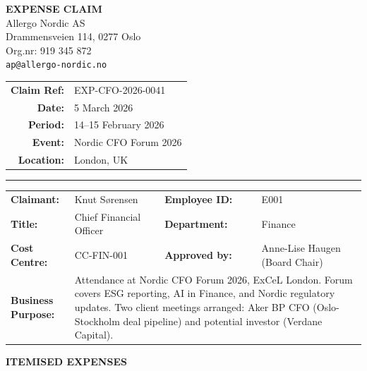 \documentclass[a4paper,11pt]{article}
\begin{document}
\noindent
\begin{minipage}[t]{0.52\textwidth}
  {\color{brand}\LARGE\bfseries EXPENSE CLAIM}\\[4pt]
  {\large Allergo Nordic AS}\\[4pt]
  \small Drammensveien 114, 0277 Oslo\\
  Org.nr: 919 345 872\\
  \texttt{ap@allergo-nordic.no}
\end{minipage}
\hfill
\begin{minipage}[t]{0.42\textwidth}
  \raggedleft
  \begin{tabular}{rl}
    \textbf{Claim Ref:}   & EXP-CFO-2026-0041 \\
    \textbf{Date:}        & 5 March 2026 \\
    \textbf{Period:}      & 14--15 February 2026 \\
    \textbf{Event:}       & Nordic CFO Forum 2026 \\
    \textbf{Location:}    & London, UK \\
  \end{tabular}
\end{minipage}

\vspace{12pt}
\noindent\rule{\textwidth}{1.5pt}
\vspace{8pt}

\noindent
\begin{tabularx}{\textwidth}{lX lX}
  \textbf{Claimant:}       & Knut Sørensen &
  \textbf{Employee ID:}    & E001 \\
  \textbf{Title:}          & Chief Financial Officer &
  \textbf{Department:}     & Finance \\
  \textbf{Cost Centre:}    & CC-FIN-001 &
  \textbf{Approved by:}    & Anne-Lise Haugen (Board Chair) \\
  \textbf{Business Purpose:} &
  \multicolumn{3}{p{10cm}}{Attendance at Nordic CFO Forum 2026, ExCeL London.
  Forum covers ESG reporting, AI in Finance, and Nordic regulatory updates.
  Two client meetings arranged: Aker BP CFO (Oslo-Stockholm deal pipeline) and
  potential investor (Verdane Capital).} \\
\end{tabularx}

\vspace{14pt}

\noindent\textbf{\textcolor{brand}{ITEMISED EXPENSES}}
\end{document}
